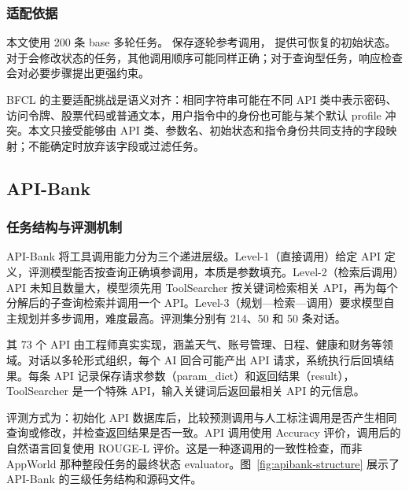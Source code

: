 \subsubsection{适配依据}

本文使用 200 条 base 多轮任务。 保存逐轮参考调用， 提供可恢复的初始状态。对于会修改状态的任务，其他调用顺序可能同样正确；对于查询型任务，响应检查会对必要步骤提出更强约束。

BFCL 的主要适配挑战是语义对齐：相同字符串可能在不同 API 类中表示密码、访问令牌、股票代码或普通文本，用户指令中的身份也可能与某个默认 profile 冲突。本文只接受能够由 API 类、参数名、初始状态和指令身份共同支持的字段映射；不能确定时放弃该字段或过滤任务。

\subsection{API-Bank}

\subsubsection{任务结构与评测机制}

API-Bank 将工具调用能力分为三个递进层级\citep{li2023apibank}。Level-1（直接调用）给定 API 定义，评测模型能否按查询正确填参调用，本质是参数填充。Level-2（检索后调用）API 未知且数量大，模型须先用 ToolSearcher 按关键词检索相关 API，再为每个分解后的子查询检索并调用一个 API。Level-3（规划—检索—调用）要求模型自主规划并多步调用，难度最高。评测集分别有 214、50 和 50 条对话。

其 73 个 API 由工程师真实实现，涵盖天气、账号管理、日程、健康和财务等领域。对话以多轮形式组织，每个 AI 回合可能产出 API 请求，系统执行后回填结果。每条 API 记录保存请求参数（param\_dict）和返回结果（result），ToolSearcher 是一个特殊 API，输入关键词后返回最相关 API 的元信息。

评测方式为：初始化 API 数据库后，比较预测调用与人工标注调用是否产生相同查询或修改，并检查返回结果是否一致。API 调用使用 Accuracy 评价，调用后的自然语言回复使用 ROUGE-L 评价。这是一种逐调用的一致性检查，而非 AppWorld 那种整段任务的最终状态 evaluator。图~\ref{fig:apibank-structure} 展示了 API-Bank 的三级任务结构和源码文件。

